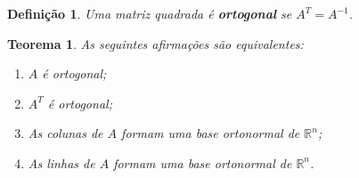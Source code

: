 \documentclass{article}
\newtheorem{theorem}{Teorema}[section]
\newtheorem*{definition}{Definição}
\begin{document}
\begin{definition}
	Uma matriz quadrada é \textbf{ortogonal} se $A^T = A^{-1}$.
\end{definition}

\begin{theorem}
	As seguintes afirmações são equivalentes:
	
	\begin{enumerate}
		\item $A$ é ortogonal;
		\item $A^T$ é ortogonal;
		\item As colunas de $A$ formam uma base ortonormal de $\mathbb{R}^n$;
		\item As linhas de $A$ formam uma base ortonormal de $\mathbb{R}^n$.
	\end{enumerate}
	
\end{theorem}
\end{document}

